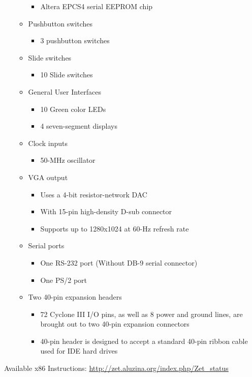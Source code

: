 \documentclass[twoside]{article}
\begin{document}
\begin{itemize}
\begin{itemize}
\begin{itemize}
		\item Altera EPCS4 serial EEPROM chip
		\end{itemize}
	\item Pushbutton switches
		\begin{itemize}
		\item 3 pushbutton switches
		\end{itemize}
	\item Slide switches
		\begin{itemize}
		\item 10 Slide switches
		\end{itemize}
	\item General User Interfaces
		\begin{itemize}
		\item 10 Green color LEDs
		\item 4 seven-segment displays
		\end{itemize}
	\item Clock inputs
		\begin{itemize}
		\item 50-MHz oscillator
		\end{itemize}
	\item VGA output
		\begin{itemize}
		\item Uses a 4-bit resistor-network DAC
		\item With 15-pin high-density D-sub connector
		\item Supports up to 1280x1024 at 60-Hz refresh rate
		\end{itemize}
	\item Serial ports
		\begin{itemize}
		\item One RS-232 port (Without DB-9 serial connector)
		\item One PS/2 port
		\end{itemize}
	\item Two 40-pin expansion headers
		\begin{itemize}
		\item 72 Cyclone III I/O pins, as well as 8 power and ground lines, are brought out to two 40-pin expansion connectors
		\item40-pin header is designed to accept a standard 40-pin ribbon cable used for IDE hard drives 
		\end{itemize}
	\end{itemize}
\end{itemize}

Available x86 Instructions: \url{ http://zet.aluzina.org/index.php/Zet_status}
\end{document}
